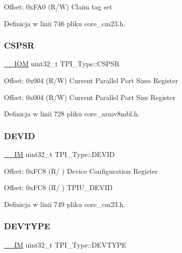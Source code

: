 Offset\+: 0x\+F\+A0 (R/W) Claim tag set 

Definicja w linii 746 pliku core\+\_\+cm23.\+h.

\mbox{\label{struct_t_p_i___type_a8826aa84e5806053395a742d38d59d0f}} 
\subsubsection{\texorpdfstring{C\+S\+P\+SR}{CSPSR}}
{\footnotesize\ttfamily \hyperlink{core__sc300_8h_ab6caba5853a60a17e8e04499b52bf691}{\+\_\+\+\_\+\+I\+OM} uint32\+\_\+t T\+P\+I\+\_\+\+Type\+::\+C\+S\+P\+SR}

Offset\+: 0x004 (R/W) Current Parallel Port Sizes Register

Offset\+: 0x004 (R/W) Current Parallel Port Size Register 

Definicja w linii 728 pliku core\+\_\+armv8mbl.\+h.

\mbox{\label{struct_t_p_i___type_abc0ecda8a5446bc754080276bad77514}} 
\subsubsection{\texorpdfstring{D\+E\+V\+ID}{DEVID}}
{\footnotesize\ttfamily \hyperlink{core__sc300_8h_a4cc1649793116d7c2d8afce7a4ffce43}{\+\_\+\+\_\+\+IM} uint32\+\_\+t T\+P\+I\+\_\+\+Type\+::\+D\+E\+V\+ID}

Offset\+: 0x\+F\+C8 (R/ ) Device Configuration Register

Offset\+: 0x\+F\+C8 (R/ ) T\+P\+I\+U\+\_\+\+D\+E\+V\+ID 

Definicja w linii 749 pliku core\+\_\+cm23.\+h.

\mbox{\label{struct_t_p_i___type_ad98855854a719bbea33061e71529a472}} 
\subsubsection{\texorpdfstring{D\+E\+V\+T\+Y\+PE}{DEVTYPE}}
{\footnotesize\ttfamily \hyperlink{core__sc300_8h_a4cc1649793116d7c2d8afce7a4ffce43}{\+\_\+\+\_\+\+IM} uint32\+\_\+t T\+P\+I\+\_\+\+Type\+::\+D\+E\+V\+T\+Y\+PE}

